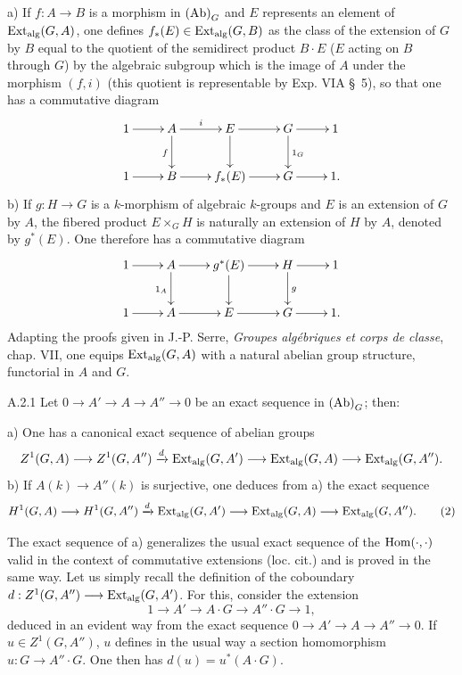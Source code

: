 \noindent a) If $f:A\to B$ is a morphism in $\textup{(Ab)}_G$ and $E$ represents an element of $\operatorname{Ext}_{\mathrm{alg}}(G,A)$, one defines $f_*(E)\in\operatorname{Ext}_{\mathrm{alg}}(G,B)$ as the class of the extension of $G$ by $B$ equal to the quotient of the semidirect product $B\cdot E$ ($E$ acting on $B$ through $G$) by the algebraic subgroup which is the image of $A$ under the morphism $(f,i)$ (this quotient is representable by Exp. VIA \S\ 5), so that one has a commutative diagram
\[
\xymatrix{1\ar[r]&A\ar[r]^i\ar[d]_f&E\ar[r]\ar[d]&G\ar[r]\ar[d]^{1_G}&1\\1\ar[r]&B\ar[r]&f_*(E)\ar[r]&G\ar[r]&1.}
\]
\noindent b) If $g:H\to G$ is a $k$-morphism of algebraic $k$-groups and $E$ is an extension of $G$ by $A$, the fibered product $E\times_G H$ is naturally an extension of $H$ by $A$, denoted by $g^*(E)$. One therefore has a commutative diagram
\[
\xymatrix{1\ar[r]&A\ar[r]\ar[d]_{1_A}&g^*(E)\ar[r]\ar[d]&H\ar[r]\ar[d]^g&1\\1\ar[r]&A\ar[r]&E\ar[r]&G\ar[r]&1.}
\]
Adapting the proofs given in J.-P. Serre, \emph{Groupes algébriques et corps de classe}, chap. VII, one equips $\operatorname{Ext}_{\mathrm{alg}}(G,A)$ with a natural abelian group structure, functorial in $A$ and $G$.

\begin{proposition}{A.2.1}\label{XVII.A.2.1}
Let $0\to A'\to A\to A''\to0$ be an exact sequence in $\textup{(Ab)}_G$; then:

\noindent a) One has a canonical exact sequence of abelian groups
\[
Z^1(G,A)\longrightarrow Z^1(G,A'')\xrightarrow{d}\operatorname{Ext}_{\mathrm{alg}}(G,A')\longrightarrow\operatorname{Ext}_{\mathrm{alg}}(G,A)\longrightarrow\operatorname{Ext}_{\mathrm{alg}}(G,A'').
\]
\noindent b) If $A(k)\to A''(k)$ is surjective, one deduces from a) the exact sequence
\[
H^1(G,A)\longrightarrow H^1(G,A'')\xrightarrow{d}\operatorname{Ext}_{\mathrm{alg}}(G,A')\longrightarrow\operatorname{Ext}_{\mathrm{alg}}(G,A)\longrightarrow\operatorname{Ext}_{\mathrm{alg}}(G,A'').\tag{2}
\]
\end{proposition}
The exact sequence of a) generalizes the usual exact sequence of the $\operatorname{Hom}(\cdot,\cdot)$ valid in the context of commutative extensions (loc. cit.) and is proved in the same way. Let us simply recall the definition of the coboundary $d:Z^1(G,A'')\longrightarrow\operatorname{Ext}_{\mathrm{alg}}(G,A')$. For this, consider the extension
\[
1\longrightarrow A'\longrightarrow A\cdot G\longrightarrow A''\cdot G\longrightarrow1,
\]
deduced in an evident way from the exact sequence $0\to A'\to A\to A''\to0$. If $u\in Z^1(G,A'')$, $u$ defines in the usual way a section homomorphism $u:G\to A''\cdot G$. One then has $d(u)=u^*(A\cdot G)$.

